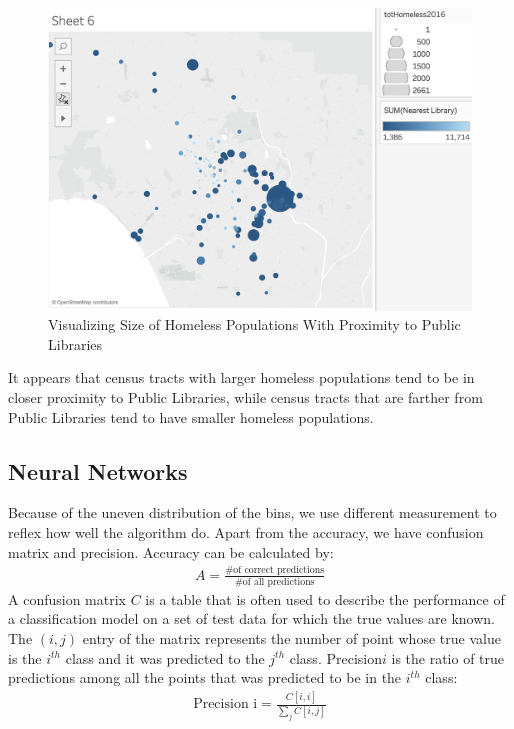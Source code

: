 \documentclass[11pt,letterpaper]{article}
\begin{document}
\begin{figure}[H]
\centering
\caption{Visualizing Size of Homeless Populations With Proximity to Public Libraries}
\includegraphics[scale=.5]{dark_libs.png}
\end{figure}

It appears that census tracts with larger homeless populations tend to be in closer proximity to Public Libraries, while census tracts that are farther from Public Libraries tend to have smaller homeless populations.

\subsection{Neural Networks}

Because of the uneven distribution of the bins, we use different measurement to reflex how well the algorithm do. Apart from the accuracy, we have confusion matrix and precision. Accuracy can be calculated by:
\begin{align}
A = \frac{\text{\# of correct predictions}}{\text{\# of all predictions}}
\end{align}
A confusion matrix $C$ is a table that is often used to describe the performance of a classification model on a set of test data for which the true values are known. The $(i,j)$ entry of the matrix represents  the number of point whose true value is the $i^{th}$ class and it was predicted to the $j^{th}$ class. Precision$i$ is the ratio of true predictions among all the points that was predicted to be in the $i^{th}$ class:
\begin{align}
\text{Precision i} = \frac{C[i,i]}{\sum_j C[i,j]}
\end{align}
\end{document}
